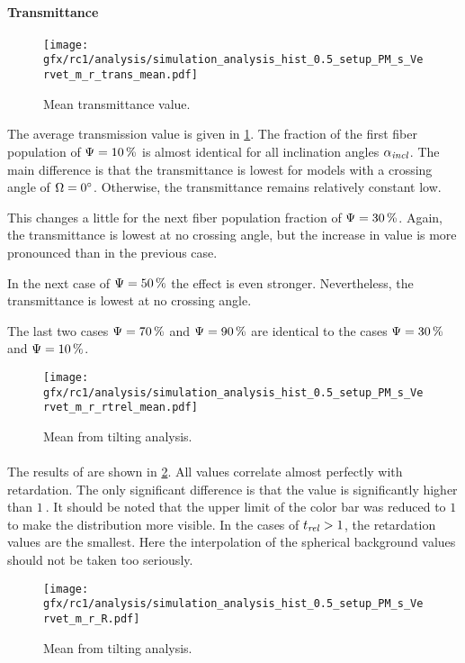 \paragraph{Transmittance}
% 
\begin{figure}[!p]
\centering
\texttt{[image: gfx/rc1/analysis/simulation\_analysis\_hist\_0.5\_setup\_PM\_s\_Vervet\_m\_r\_trans\_mean.pdf]}
\caption{Mean transmittance value. }
\label{fig:sim_ana_trans}
\end{figure}
% 
The average transmission value is given in \cref{fig:sim_ana_trans}.
The fraction of the first fiber population of $\textnormal{$\Psi$}=\SI{10}{\percent}$ is almost identical for all inclination angles $\textnormal{$\alpha_{\mathit{incl}}$}$.
The main difference is that the transmittance is lowest for models with a crossing angle of $\textnormal{$\Omega$} = \SI{0}{\degree}$.
Otherwise, the transmittance remains relatively constant low.
\par
%
This changes a little for the next fiber population fraction of $\textnormal{$\Psi$}=\SI{30}{\percent}$.
Again, the transmittance is lowest at no crossing angle, but the increase in value is more pronounced than in the previous case.
\par
%
In the next case of $\textnormal{$\Psi$}=\SI{50}{\percent}$ the effect is even stronger.
Nevertheless, the transmittance is lowest at no crossing angle.
\par
%
The last two cases $\textnormal{$\Psi$}=\SI{70}{\percent}$ and $\textnormal{$\Psi$}=\SI{90}{\percent}$ are identical to the cases $\textnormal{$\Psi$}=\SI{30}{\percent}$ and $\textnormal{$\Psi$}=\SI{10}{\percent}$.
%
\begin{figure}[!p]
\centering
\texttt{[image: gfx/rc1/analysis/simulation\_analysis\_hist\_0.5\_setup\_PM\_s\_Vervet\_m\_r\_rtrel\_mean.pdf]}
\caption{Mean \trel{} from tilting analysis. }
\label{fig:sim_ana_trel}
\end{figure}
%
\paragraph{\trel}
The results of \trel{} are shown in \cref{fig:sim_ana_trel}.
All values correlate almost perfectly with retardation.
The only significant difference is that the \trel{} value is significantly higher than $\SI{1}{}$.
It should be noted that the upper limit of the color bar was reduced to $\SI{1}{}$ to make the distribution more visible.
In the cases of $\textnormal{$t_\mathit{rel}$} > \SI{1}{}$, the retardation values are the smallest.
Here the interpolation of the spherical background values should not be taken too seriously.
% 
\begin{figure}[!p]
\centering
\texttt{[image: gfx/rc1/analysis/simulation\_analysis\_hist\_0.5\_setup\_PM\_s\_Vervet\_m\_r\_R.pdf]}
\caption{Mean \rvalue{} from tilting analysis. }
\label{fig:sim_ana_rvalue}
\end{figure}
%
